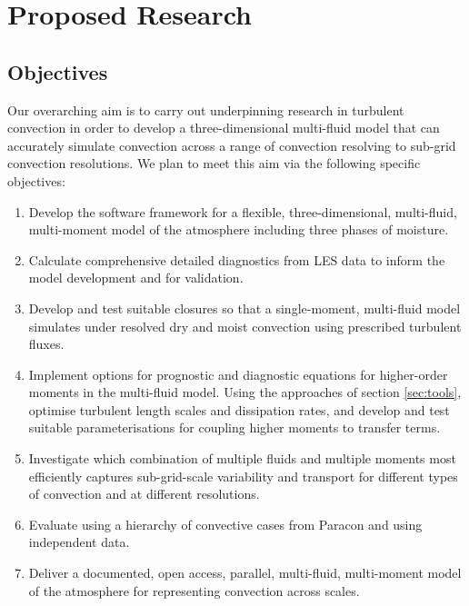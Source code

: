 \documentclass[11pt,a4paper]{article}
\begin{document}
\section{Proposed Research}

\subsection{Objectives}

Our overarching aim is to carry out underpinning research in turbulent convection in order to develop a three-dimensional multi-fluid model that can accurately simulate convection across a range of convection resolving to sub-grid convection resolutions.
We plan to meet this aim via the following specific objectives:

\begin{enumerate}
\item\label{it:model} Develop the software framework for a flexible, three-dimensional, multi-fluid, multi-moment model of the atmosphere including three phases of moisture. %

\item\label{it:budgets} Calculate comprehensive detailed diagnostics from LES data to inform the model development and for validation.

\item Develop and test suitable closures so that a single-moment, multi-fluid model simulates under resolved dry and moist convection using prescribed turbulent fluxes.

\item Implement options for prognostic and diagnostic equations for higher-order moments in the multi-fluid model. Using the approaches of section \ref{sec:tools}, optimise turbulent length scales and dissipation rates, and develop and test suitable parameterisations for coupling higher moments to transfer terms.

\item Investigate which combination of multiple fluids and multiple moments most efficiently captures sub-grid-scale
variability and transport for different types of convection and at different resolutions.

\item Evaluate using a hierarchy of convective cases from Paracon and using independent data.

\item Deliver a documented, open access, parallel, multi-fluid, multi-moment model of the atmosphere for representing convection across scales.
\end{enumerate}
\end{document}
